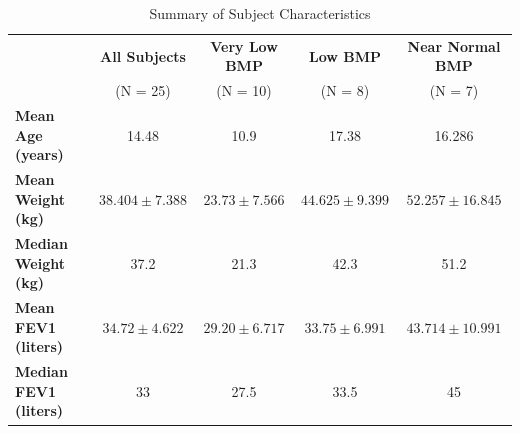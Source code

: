 \documentclass{article}
\begin{document}
		\begin{table}[h]
			\centering
			\footnotesize
			\renewcommand{\arraystretch}{1.2} %
			\caption{Summary of Subject Characteristics}
			\begin{tabular}{l c c c c}
				\toprule
				& \textbf{All Subjects} & \textbf{Very Low BMP} & \textbf{Low BMP} & \textbf{Near Normal BMP} \\
				& (N = 25) & (N = 10) & (N = 8) & (N = 7) \\
				\midrule
				\textbf{Mean Age (years)} & 14.48 & 10.9 & 17.38 & 16.286 \\
				\textbf{Mean Weight (kg)} & $38.404 \pm 7.388$ & $23.73 \pm 7.566$ & $44.625 \pm 9.399$ & $52.257 \pm 16.845$ \\
				\textbf{Median Weight (kg)} & 37.2 & 21.3 & 42.3 & 51.2 \\
				\textbf{Mean FEV1 (liters)} & $34.72 \pm 4.622$ & $29.20 \pm 6.717$ & $33.75 \pm 6.991$ & $43.714 \pm 10.991$ \\
				\textbf{Median FEV1 (liters)} & 33 & 27.5 & 33.5 & 45 \\
				\bottomrule
			\end{tabular}
			\label{tab:bmp_stats}
		\end{table}

		\newpage
\end{document}
